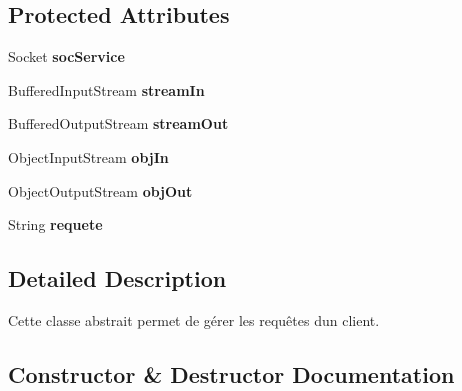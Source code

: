 \subsection*{Protected Attributes}
\begin{DoxyCompactItemize}
\item 
\mbox{\label{classgestionnaireRequete_1_1GestionnaireRequetes_a52fc455531cd68bc9495d0ad0351f6d9}} 
Socket {\bfseries soc\+Service}
\item 
\mbox{\label{classgestionnaireRequete_1_1GestionnaireRequetes_ac0c4788d552f54cca0bf4d73e9c57300}} 
Buffered\+Input\+Stream {\bfseries stream\+In}
\item 
\mbox{\label{classgestionnaireRequete_1_1GestionnaireRequetes_a616ecc1b5abfa7363497f84d2e17342a}} 
Buffered\+Output\+Stream {\bfseries stream\+Out}
\item 
\mbox{\label{classgestionnaireRequete_1_1GestionnaireRequetes_a505d88bbe17a513d54c8e30b878df7f9}} 
Object\+Input\+Stream {\bfseries obj\+In}
\item 
\mbox{\label{classgestionnaireRequete_1_1GestionnaireRequetes_a775bd6fdb30b8c0c2405c6e6b7800bd6}} 
Object\+Output\+Stream {\bfseries obj\+Out}
\item 
\mbox{\label{classgestionnaireRequete_1_1GestionnaireRequetes_a557720ba61fd14d2a12f81743fc1febe}} 
String {\bfseries requete}
\end{DoxyCompactItemize}


\subsection{Detailed Description}
Cette classe abstrait permet de gérer les requêtes d\textquotesingle{}un client. 

\subsection{Constructor \& Destructor Documentation}
\mbox{\label{classgestionnaireRequete_1_1GestionnaireRequetes_a30364d904d0ab798250e1f7a0a7e9465}} 
